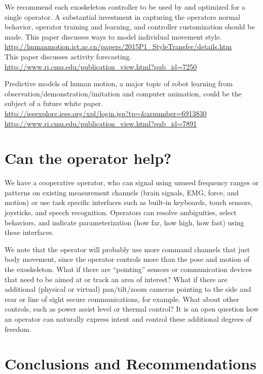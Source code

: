 \documentclass[letterpaper,12pt,fullpage]{article}
\begin{document}
We recommend each exoskeleton controller
to be used by and optimized for a single operator.
A substantial investment in capturing the operators normal behavior,
operator training and learning, and controller customization should be made.
This paper discusses ways to model individual movement style.\\
\url{http://humanmotion.ict.ac.cn/papers/2015P1_StyleTransfer/details.htm}\\
This paper discusses activity forecasting.\\
\url{http://www.ri.cmu.edu/publication_view.html?pub_id=7250}

Predictive models of human motion, a major topic of robot learning from\\
observation/demonstration/imitation and computer animation,
could be the subject of a future white
paper.\\
\url{http://ieeexplore.ieee.org/xpl/login.jsp?tp=&arnumber=6913830}\\
\url{http://www.ri.cmu.edu/publication_view.html?pub_id=7891}

\section{Can the operator help?}

We have a cooperative operator, who can signal using unused frequency
ranges or patterns on existing measurement
channels (brain signals, EMG, force, and motion) or use 
task specific interfaces such as built-in keyboards, touch sensors, joysticks,
and speech recognition.
Operators can resolve ambiguities, select behaviors, and indicate
parameterization (how far, how high, how fast) using these interfaces.

We note that the operator will probably use more command channels that just
body movement, since
the operator controls more than the pose and motion of the
exoskeleton. What if there are ``pointing'' sensors or communication
devices that need to be aimed at or track an area of interest? What if
there are additional (physical or virtual) pan/tilt/zoom cameras
pointing to the side and rear or line of sight secure communications,
for example. What about other controls, such as power assist level or
thermal control? It is an open question
how an operator can naturally express intent and
control these additional degrees of freedom.

\section{Conclusions and Recommendations}
\end{document}
